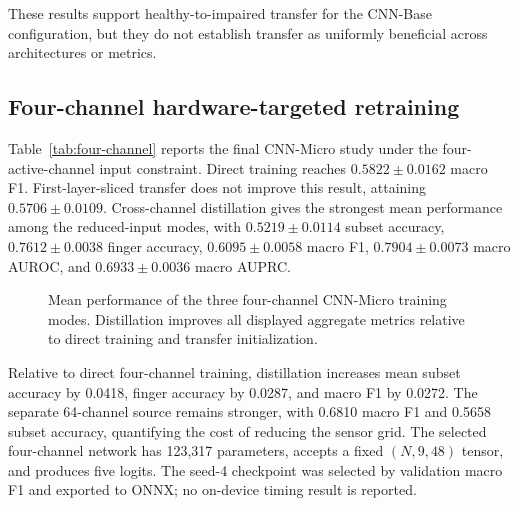\begin{table}[!htbp]
  \centering
  \small
  \caption{Healthy-to-impaired transfer-learning summaries. CNN rows use the tuned CNN-Base configuration. Bold values compare pretraining and finetuning within each architecture.}
  \label{tab:transfer-learning}
  
\end{table}

These results support healthy-to-impaired transfer for the CNN-Base configuration, but they do not establish transfer as uniformly beneficial across architectures or metrics.
\FloatBarrier

\subsection{Four-channel hardware-targeted retraining}

Table~\ref{tab:four-channel} reports the final CNN-Micro study under the four-active-channel input constraint. Direct training reaches $0.5822\pm0.0162$ macro F1. First-layer-sliced transfer does not improve this result, attaining $0.5706\pm0.0109$. Cross-channel distillation gives the strongest mean performance among the reduced-input modes, with $0.5219\pm0.0114$ subset accuracy, $0.7612\pm0.0038$ finger accuracy, $0.6095\pm0.0058$ macro F1, $0.7904\pm0.0073$ macro AUROC, and $0.6933\pm0.0036$ macro AUPRC.

\begin{table}[!htbp]
  \centering
  \small
  \caption{Hardware-targeted CNN-Micro results. Four-channel entries are mean $\pm$ sample standard deviation across five seeds. The 64-channel source is a separate single-seed reference and is not included in the variance comparison. Bold values mark the best four-channel mean.}
  \label{tab:four-channel}
  \resizebox{\linewidth}{!}{}
\end{table}

\begin{figure}[!htbp]
  \centering
  
  \caption{Mean performance of the three four-channel CNN-Micro training modes. Distillation improves all displayed aggregate metrics relative to direct training and transfer initialization.}
  \label{fig:four-channel}
\end{figure}

Relative to direct four-channel training, distillation increases mean subset accuracy by 0.0418, finger accuracy by 0.0287, and macro F1 by 0.0272. The separate 64-channel source remains stronger, with 0.6810 macro F1 and 0.5658 subset accuracy, quantifying the cost of reducing the sensor grid. The selected four-channel network has 123,317 parameters, accepts a fixed $(N,9,48)$ tensor, and produces five logits. The seed-4 checkpoint was selected by validation macro F1 and exported to ONNX; no on-device timing result is reported.
\FloatBarrier

